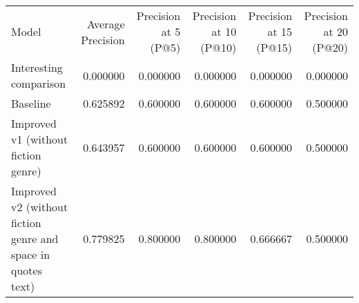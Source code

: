 \begin{tabular}{lrrrrr}
Model & Average Precision & Precision at 5 (P@5) & Precision at 10 (P@10) & Precision at 15 (P@15) & Precision at 20 (P@20) \\
Interesting comparison & 0.000000 & 0.000000 & 0.000000 & 0.000000 & 0.000000 \\
Baseline & 0.625892 & 0.600000 & 0.600000 & 0.600000 & 0.500000 \\
Improved v1 (without fiction genre) & 0.643957 & 0.600000 & 0.600000 & 0.600000 & 0.500000 \\
Improved v2 (without fiction genre and space in quotes text) & 0.779825 & 0.800000 & 0.800000 & 0.666667 & 0.500000 \\
\end{tabular}
